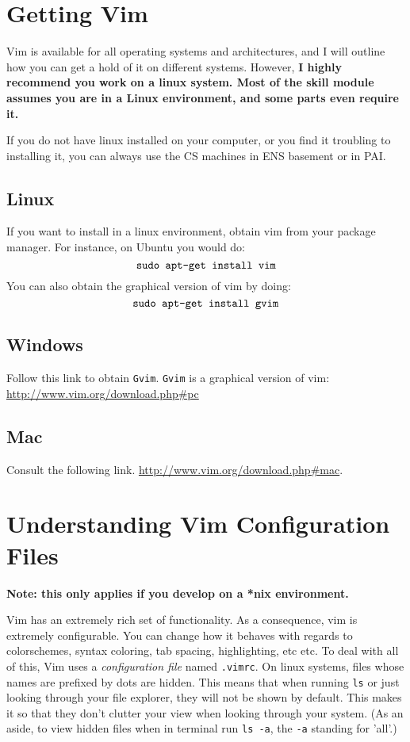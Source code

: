\section{Getting Vim}
Vim is available for all operating systems and architectures, and I will
outline how you can get a hold of it on different systems. However, 
{\bf I highly recommend you work on a linux system. Most of the skill module 
assumes you are in a Linux environment, and some parts even require it.}

If you do not have linux installed on your computer, or you find it troubling
to installing it, you can always use the CS machines in ENS basement or 
in PAI.

\subsection{Linux}
If you want to install in a linux environment, obtain vim from your package 
manager. For instance, on Ubuntu you would do:
$$\text{\texttt{sudo apt-get install vim}}$$
You can also obtain the graphical version of vim by doing:
$$\text{\texttt{sudo apt-get install gvim}}$$

\subsection{Windows}
Follow this link to obtain \texttt{Gvim}. \texttt{Gvim} is a graphical
version of vim:
\url{http://www.vim.org/download.php#pc}

\subsection{Mac}
Consult the following link. \url{http://www.vim.org/download.php#mac}.

\section{Understanding Vim Configuration Files}
{\bf Note: this only applies if you develop on a *nix environment.}

Vim has an extremely rich set of functionality. As a consequence, 
vim is extremely configurable. You can change how it behaves with regards to 
colorschemes, syntax coloring, tab spacing, highlighting, etc etc. 
To deal with all of this, Vim uses a \emph{configuration file} named 
\texttt{.vimrc}. On linux systems, files whose names are prefixed by dots 
are hidden. This means that when running \texttt{ls}
or just looking through your file explorer, they will not be shown by default.
This makes it so that they don't clutter your view when looking through your
system. (As an aside, to view hidden files when in terminal run
\texttt{ls -a}, the \texttt{-a} standing for 'all'.)

